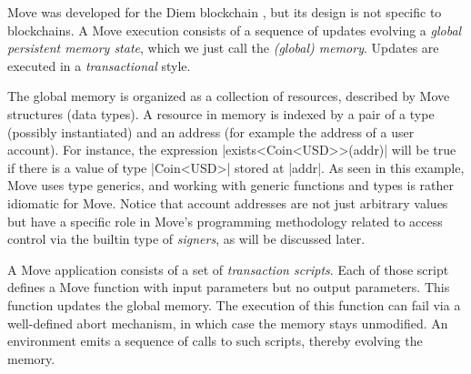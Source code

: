 

Move was developed for the Diem blockchain \cite{DIEM}, but its design is not
specific to blockchains.  A Move execution consists of a sequence of updates
evolving a \emph{global persistent memory state}, which we just call the
\emph{(global) memory}.  Updates are executed in a \emph{transactional} style.

The global memory is organized as a collection of resources, described by Move
structures (data types). A resource in memory is indexed by a pair of a type
(possibly instantiated) and an address (for example the address of a user
account). For instance, the expression |exists<Coin<USD>>(addr)| will be true if
there is a value of type |Coin<USD>| stored at |addr|. As seen in this example,
Move uses type generics, and working with generic functions and types is rather
idiomatic for Move.  Notice that account addresses are not just arbitrary values
but have a specific role in Move's programming methodology related to access
control via the builtin type of \emph{signers}, as will be discussed later.

A Move application consists of a set of \emph{transaction scripts}. Each of
those script defines a Move function with input parameters but no output
parameters.  This function updates the global memory. The execution of this
function can fail via a well-defined abort mechanism, in which case the memory
stays unmodified. An environment emits a sequence of calls to such scripts,
thereby evolving the memory.



